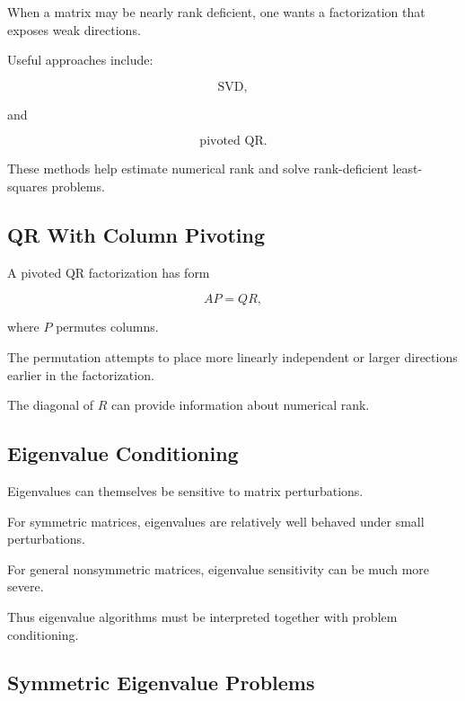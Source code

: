 When a matrix may be nearly rank deficient, one wants a factorization that
exposes weak directions.

Useful approaches include:

\[
\boxed{
\text{SVD},
}
\]

and

\[
\boxed{
\text{pivoted QR}.
}
\]

These methods help estimate numerical rank and solve rank-deficient least-
squares problems.

\subsection{QR With Column Pivoting}
\label{subsec:qr-column-pivoting}

A pivoted QR factorization has form

\[
\boxed{
AP
=
QR,
}
\]

where \(P\) permutes columns.

The permutation attempts to place more linearly independent or larger
directions earlier in the factorization.

The diagonal of \(R\) can provide information about numerical rank.

\subsection{Eigenvalue Conditioning}
\label{subsec:eigenvalue-conditioning}

Eigenvalues can themselves be sensitive to matrix perturbations.

For symmetric matrices, eigenvalues are relatively well behaved under
small perturbations.

For general nonsymmetric matrices, eigenvalue sensitivity can be much more
severe.

Thus eigenvalue algorithms must be interpreted together with problem
conditioning.

\subsection{Symmetric Eigenvalue Problems}
\label{subsec:symmetric-eigenvalue-problems}

